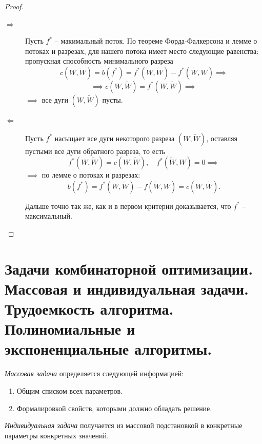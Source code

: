 \begin{proof}\leavevmode
    \begin{description}
        \item[$ \boxed{\Rightarrow} $] Пусть $ f^* $ -- макимальный поток. По теореме Форда-Фалкерсона и лемме о потоках и разрезах, для нашего потока имеет место следующие равенства: пропускная способность минимального разреза
              \[
                  c(W,\widetilde{W}) = b(f^*) = f^*(W,\widetilde{W}) - f^*(\widetilde{W},W) \implies
              \]
              \[
                  \implies c(W,\widetilde{W}) = f^*(W,\widetilde{W}) \implies
              \]
              $ \implies $ все дуги $ (W,\widetilde{W}) $ пусты.

        \item[$ \boxed{\Leftarrow} $] Пусть $ f^* $ насыщает все дуги некоторого разреза $ (W,\widetilde{W}) $, оставляя пустыми все дуги обратного разреза, то есть
              \[
                  f^*(W,\widetilde{W}) = c(W,\widetilde{W}), \quad f^*(\widetilde{W},W) = 0 \implies
              \]
              $ \implies $ по лемме о потоках и разрезах:
              \[
                  b(f^*) = f^*(W,\widetilde{W}) - f(\widetilde{W},W) = c(W,\widetilde{W}).
              \]

              Дальше точно так же, как и в первом критерии доказывается, что $ f^* $ -- максимальный.
    \end{description}
\end{proof}

\section{Задачи комбинаторной оптимизации. Массовая и индивидуальная задачи. Трудоемкость алгоритма. Полиномиальные и экспоненциальные алгоритмы.}

\begin{definition}
    \emph{Массовая задача} определяется следующей информацией:
    \begin{enumerate}
        \item Общим списком всех параметров.
        \item Формалировкой свойств, которыми должно обладать решение.
    \end{enumerate}
\end{definition}

\begin{definition}
    \emph{Индивидуальная задача} получается из массовой подстановкой в конкретные параметры конкретных значений.
\end{definition}

